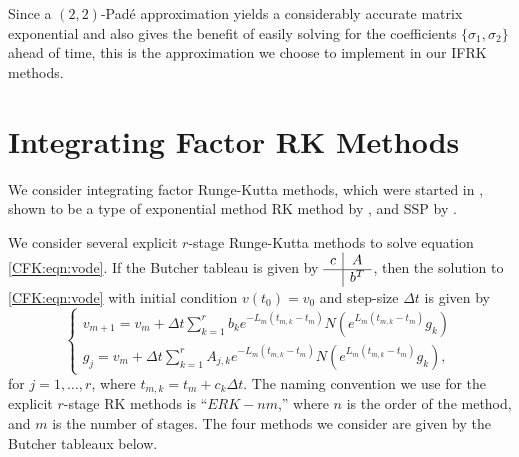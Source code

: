\documentclass{csri19}
\begin{document}
Since a $(2,2)$-Pad\'e approximation yields a considerably accurate matrix 
exponential and also gives the benefit of easily solving for the 
coefficients $\{\sigma_1, \sigma_2\}$ ahead of time, this is the 
approximation we choose to implement in our IFRK methods.

\section{Integrating Factor RK Methods}\label{CFK:sec:ifrk}
We consider integrating factor Runge-Kutta methods, which were started in 
\cite{CFK:Lawson1969}, shown to be a type of exponential method RK method by
\cite{CFK:Minchev2006}, and SSP by \cite{CFK:Isherwood2018}.

We consider several explicit $r$-stage Runge-Kutta methods to solve equation
\ref{CFK:eqn:vode}. If the Butcher tableau is given by $\begin{array}{c|c}
c & A \\ \hline & b^T \end{array}$, then the solution to \ref{CFK:eqn:vode} with
initial condition $v(t_0) = v_0$ and step-size $\Delta t$ is given by
\[ \left\{\begin{array}{l} v_{m+1} = v_m + \Delta t\sum_{k=1}^r b_k 
                         e^{-L_m(t_{m,k}-t_m)}N(e^{L_m(t_{m,k}-t_m)}g_k) \\
          g_j = v_m + \Delta t \sum_{k=1}^r A_{j,k} e^{-L_m(t_{m,k} - t_m)} 
                      N(e^{L_m(t_{m,k}-t_m)}g_k), \end{array} \right. \]
for $j = 1,\dots,r$, where $t_{m,k} = t_m + c_k \Delta t$.
The naming convention we use for the explicit $r$-stage RK methods is ``$ERK
-nm$,'' where $n$ is the order of the method, and $m$ is the number of
stages. The four methods we consider are given by the Butcher tableaux 
below.
\end{document}
